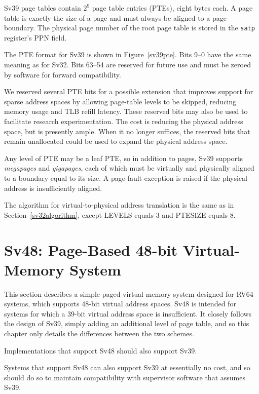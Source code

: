 Sv39 page tables contain $2^9$ page table entries (PTEs), eight
bytes each.  A page table is exactly the size of a page and must
always be aligned to a page boundary.  The physical page number of the
root page table is stored in the {\tt satp} register's PPN field.

The PTE format for Sv39 is shown in Figure~\ref{sv39pte}.  Bits 9--0
have the same meaning as for Sv32.  Bits 63--54 are reserved
for future use and must be zeroed by software for forward compatibility.

\begin{commentary}
We reserved several PTE bits for a possible extension that improves
support for sparse address spaces by allowing page-table levels to be
skipped, reducing memory usage and TLB refill latency.  These reserved
bits may also be used to facilitate research experimentation.  The
cost is reducing the physical address space, but  is
presently ample.  When it no longer suffices, the reserved
bits that remain unallocated could be used to expand the physical
address space.
\end{commentary}

Any level of PTE may be a leaf PTE, so in addition to 
pages, Sv39 supports  {\em megapages} and
 {\em gigapages}, each of which must be virtually and
physically aligned to a boundary equal to its size.
A page-fault exception is raised if the physical address is insufficiently
aligned.

The algorithm for virtual-to-physical address translation is the same as in
Section~\ref{sv32algorithm}, except LEVELS equals 3 and PTESIZE equals 8.

\section{Sv48: Page-Based 48-bit Virtual-Memory System}
\label{sec:sv48}

This section describes a simple paged virtual-memory system designed
for RV64 systems, which supports 48-bit virtual address spaces.  Sv48
is intended for systems for which a 39-bit virtual address space is
insufficient.  It closely follows the design of Sv39, simply adding an
additional level of page table, and so this chapter only details the
differences between the two schemes.

Implementations that support Sv48 should also support Sv39.

\begin{commentary}
Systems that support Sv48 can also support Sv39 at essentially no cost, and so
should do so to maintain compatibility with supervisor software that assumes
Sv39.
\end{commentary}

